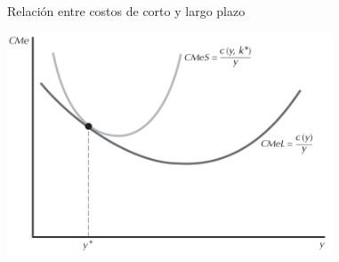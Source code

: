 \documentclass{beamer}
\theoremstyle{definition}
\begin{document}
\begin{frame}{Relaci\'on entre costos de corto y largo plazo}
	\begin{center}
\includegraphics[width=3.8in]{figures4/shortlong1.png}
\end{center}
\end{frame}
\end{document}
